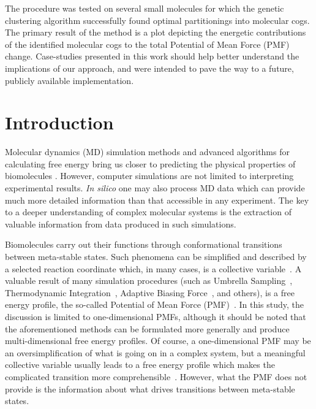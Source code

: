 \documentclass[a4paper,11pt,twoside]{book}%
\begin{document}
{\color{black}The procedure was tested on several small molecules for which the genetic clustering algorithm successfully found optimal partitionings into molecular cogs.}
The primary result of the method is a {\color{black}plot} depicting the {\color{black}energetic} contributions of the identified molecular cogs to the total Potential of Mean Force (PMF) change.
{\color{black}Case-studies presented in this work should help better understand the implications of our approach, and were intended to pave the way to a future, publicly available implementation.}


\clearpage


\section{Introduction}

Molecular dynamics (MD) simulation methods and advanced algorithms for calculating free energy bring us closer to predicting the physical properties of biomolecules \cite{woo2005calculation,chipot2014frontiers,comer2014adaptive}.
However, computer simulations are not limited to interpreting experimental results.
\emph{In silico} one may also process MD data which can provide much more detailed information than that accessible in any experiment.
The key to a deeper understanding of complex molecular systems is the extraction of valuable information from data produced in such simulations.

Biomolecules carry out their functions through conformational transitions between meta-stable states.
Such phenomena can be simplified and described by a selected reaction coordinate which, in many cases, is a collective variable~\cite{chipot2007free}.
A valuable result of many simulation procedures (such as Umbrella Sampling~\cite{torrie1977nonphysical}, Thermodynamic Integration~\cite{kirkwood1935statistical}, Adaptive Biasing Force~\cite{comer2014adaptive}, and others\cite{gumbart2012standard}), is a free energy profile, the so-called Potential of Mean Force (PMF)~\cite{kirkwood1935statistical}.
{\color{black}In this study, the discussion is limited to one-dimensional PMFs, although it should be noted that the aforementioned methods can be formulated more generally and produce multi-dimensional free energy profiles.}
Of course, a one-dimensional PMF may be an oversimplification of what is going on in a complex system, but a meaningful collective variable usually leads to a free energy profile which makes the complicated transition more comprehensible~\cite{periole2012structural,chipot2014frontiers}.
However, what the PMF does not provide is the information about what drives transitions between meta-stable states.
\end{document}
